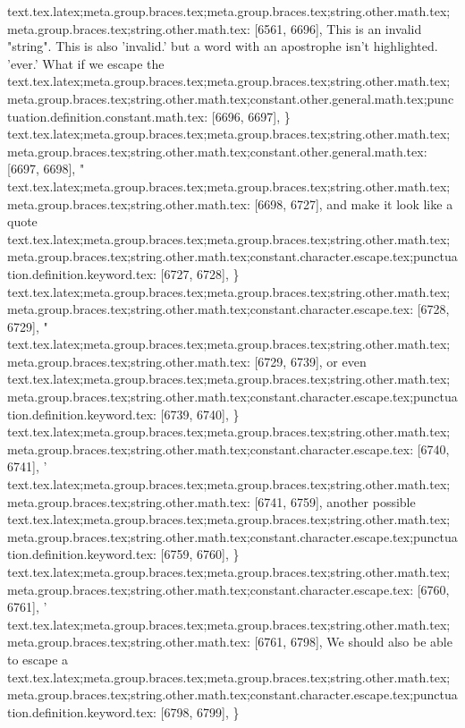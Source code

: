 {{{{{{{{{{{{{{{{{{{{{{{{{{{{{{{{{{{{{{{{{{{{{{{{{{{{{{{{{{{{{{{{{{{{{{{{{{{{{{{{{{{{{{{{{{{{{{{{{{{{{{{{{{{{{{{{{{{{{{{{{{{{{{{{{{{{{{{{{{{{{{{{{{{{{{{{{{{{{{{{{{{{{{{{{{{{{{{{{{{{{{}
text.tex.latex;meta.group.braces.tex;meta.group.braces.tex;string.other.math.tex;meta.group.braces.tex;string.other.math.tex: [6561, 6696], {This is an invalid "string".  This is also 'invalid.'  but a word with an apostrophe isn't highlighted. 'ever.'  What if we escape the }
text.tex.latex;meta.group.braces.tex;meta.group.braces.tex;string.other.math.tex;meta.group.braces.tex;string.other.math.tex;constant.other.general.math.tex;punctuation.definition.constant.math.tex: [6696, 6697], {\}
text.tex.latex;meta.group.braces.tex;meta.group.braces.tex;string.other.math.tex;meta.group.braces.tex;string.other.math.tex;constant.other.general.math.tex: [6697, 6698], {"}
text.tex.latex;meta.group.braces.tex;meta.group.braces.tex;string.other.math.tex;meta.group.braces.tex;string.other.math.tex: [6698, 6727], {and make it look like a quote}
text.tex.latex;meta.group.braces.tex;meta.group.braces.tex;string.other.math.tex;meta.group.braces.tex;string.other.math.tex;constant.character.escape.tex;punctuation.definition.keyword.tex: [6727, 6728], {\}
text.tex.latex;meta.group.braces.tex;meta.group.braces.tex;string.other.math.tex;meta.group.braces.tex;string.other.math.tex;constant.character.escape.tex: [6728, 6729], {"}
text.tex.latex;meta.group.braces.tex;meta.group.braces.tex;string.other.math.tex;meta.group.braces.tex;string.other.math.tex: [6729, 6739], {  or even }
text.tex.latex;meta.group.braces.tex;meta.group.braces.tex;string.other.math.tex;meta.group.braces.tex;string.other.math.tex;constant.character.escape.tex;punctuation.definition.keyword.tex: [6739, 6740], {\}
text.tex.latex;meta.group.braces.tex;meta.group.braces.tex;string.other.math.tex;meta.group.braces.tex;string.other.math.tex;constant.character.escape.tex: [6740, 6741], {'}
text.tex.latex;meta.group.braces.tex;meta.group.braces.tex;string.other.math.tex;meta.group.braces.tex;string.other.math.tex: [6741, 6759], { another possible }
text.tex.latex;meta.group.braces.tex;meta.group.braces.tex;string.other.math.tex;meta.group.braces.tex;string.other.math.tex;constant.character.escape.tex;punctuation.definition.keyword.tex: [6759, 6760], {\}
text.tex.latex;meta.group.braces.tex;meta.group.braces.tex;string.other.math.tex;meta.group.braces.tex;string.other.math.tex;constant.character.escape.tex: [6760, 6761], {'}
text.tex.latex;meta.group.braces.tex;meta.group.braces.tex;string.other.math.tex;meta.group.braces.tex;string.other.math.tex: [6761, 6798], {  We should also be able to escape a }
text.tex.latex;meta.group.braces.tex;meta.group.braces.tex;string.other.math.tex;meta.group.braces.tex;string.other.math.tex;constant.character.escape.tex;punctuation.definition.keyword.tex: [6798, 6799], {\}
}}}}}}}}}}}}}}}}}}}}}}}}}}}}}}}}}}}}}}}}}}}}}}}}}}}}}}}}}}}}}}}}}}}}}}}}}}}}}}}}}}}}}}}}}}}}}}}}}}}}}}}}}}}}}}}}}}}}}}}}}}}}}}}}}}}}}}}}}}}}}}}}}}}}}}}}}}}}}}}}}}}}}}}}}}}}}}}}}}}}}}}}}}
